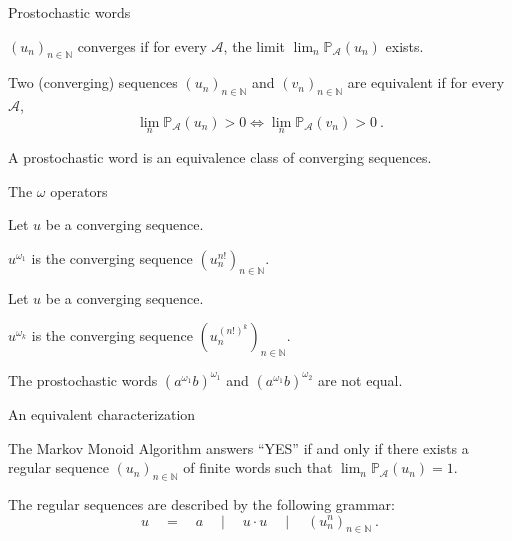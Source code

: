 \documentclass[svgnames]{beamer}
\renewcommand{\AA}{\mathcal{A}}
\newcommand{\NN}{\mathbb{N}}
\newcommand{\prob}[1]{\mathbb{P}_{#1}}
\renewcommand{\P}{\mathbb{P}}
\begin{document}
\begin{frame}{Prostochastic words}
\begin{definition}
$(u_n)_{n \in \NN}$ converges if for every $\AA$, the limit $\lim_n \P_\AA(u_n)$ exists.
\end{definition}
\pause
\begin{definition}
Two (converging) sequences $(u_n)_{n \in \NN}$ and $(v_n)_{n \in \NN}$ are equivalent if for every $\AA$,
$$\lim_n \P_\AA(u_n) > 0 \iff \lim_n \P_\AA(v_n) > 0\ .$$
\end{definition}
\pause
\begin{definition}
A prostochastic word is an equivalence class of converging sequences.
\end{definition}
\end{frame}

\begin{frame}{The $\omega$ operators}
\begin{definition}
Let $u$ be a converging sequence.

$u^{\omega_1}$ is the converging sequence $(u_n^{n!})_{n \in \NN}$.
\end{definition}
\pause
\begin{definition}
Let $u$ be a converging sequence.

$u^{\omega_k}$ is the converging sequence $(u_n^{(n!)^k})_{n \in \NN}$.
\end{definition}
\pause

\begin{example}
The prostochastic words $(a^{\omega_1} b)^{\omega_1}$ and $(a^{\omega_1} b)^{\omega_2}$ are not equal.
\end{example}
\end{frame}

\begin{frame}{An equivalent characterization}
\begin{theorem}
The Markov Monoid Algorithm answers ``YES'' if and only if
there exists a regular sequence $(u_n)_{n \in \NN}$ of finite words such that $\lim_n \prob{\AA}(u_n) = 1$.
\end{theorem}

The regular sequences are described by the following grammar:
$$u \quad = \quad a \quad \mid \quad u \cdot u \quad \mid \quad (u^n_n)_{n \in \NN}\ .$$
\end{frame}

\end{document}
